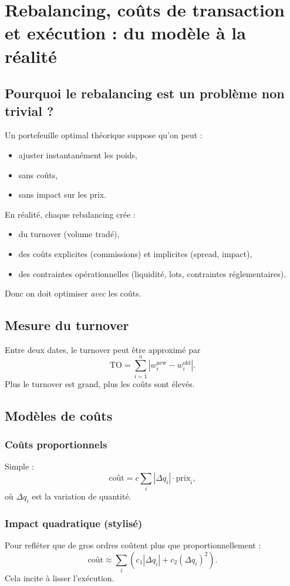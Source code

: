 \documentclass[11pt,a4paper]{report}
\newcommand{\1}{\mathbbm{1}}
\newcommand{\abs}[1]{\left|#1\right|}
\theoremstyle{definition}
\theoremstyle{plain}
\theoremstyle{remark}
\begin{document}
\chapter{Rebalancing, coûts de transaction et exécution : du modèle à la réalité}
\label{chap:rebalancing}

\section{Pourquoi le rebalancing est un problème non trivial ?}
Un portefeuille optimal théorique suppose qu'on peut :
\begin{itemize}
  \item ajuster instantanément les poids,
  \item sans coûts,
  \item sans impact sur les prix.
\end{itemize}
En réalité, chaque rebalancing crée :
\begin{itemize}
  \item du turnover (volume tradé),
  \item des coûts explicites (commissions) et implicites (spread, impact),
  \item des contraintes opérationnelles (liquidité, lots, contraintes réglementaires).
\end{itemize}
Donc on doit optimiser \emph{avec} les coûts.

\section{Mesure du turnover}
Entre deux dates, le turnover peut être approximé par
\[
\mathrm{TO} = \sum_{i=1}^n \abs{w_i^{\text{new}} - w_i^{\text{old}}}.
\]
Plus le turnover est grand, plus les coûts sont élevés.

\section{Modèles de coûts}
\subsection{Coûts proportionnels}
Simple :
\[
\text{coût} = c \sum_i \abs{\Delta q_i} \cdot \text{prix}_i,
\]
où $\Delta q_i$ est la variation de quantité.

\subsection{Impact quadratique (stylisé)}
Pour refléter que de gros ordres coûtent plus que proportionnellement :
\[
\text{coût} \approx \sum_i \left( c_1 \abs{\Delta q_i} + c_2 (\Delta q_i)^2\right).
\]
Cela incite à lisser l'exécution.
\end{document}
